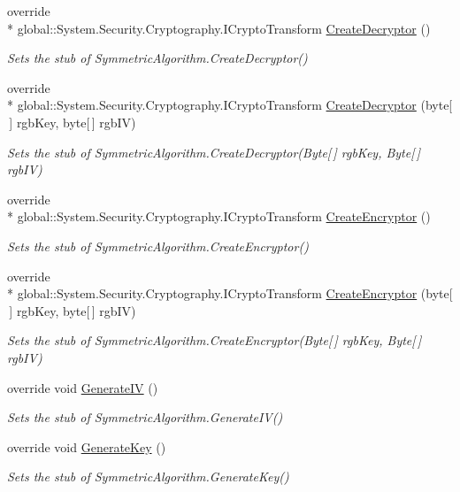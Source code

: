 \begin{DoxyCompactItemize}
override \\*
global\-::\-System.\-Security.\-Cryptography.\-I\-Crypto\-Transform \hyperlink{class_system_1_1_security_1_1_cryptography_1_1_fakes_1_1_stub_r_c2_a925355423b607e5a2ec71102f4bd8a7d}{Create\-Decryptor} ()
\begin{DoxyCompactList}\small\item\em Sets the stub of Symmetric\-Algorithm.\-Create\-Decryptor()\end{DoxyCompactList}\item 
override \\*
global\-::\-System.\-Security.\-Cryptography.\-I\-Crypto\-Transform \hyperlink{class_system_1_1_security_1_1_cryptography_1_1_fakes_1_1_stub_r_c2_a5d999c0cfb96085b1d68d06242aafa4e}{Create\-Decryptor} (byte\mbox{[}$\,$\mbox{]} rgb\-Key, byte\mbox{[}$\,$\mbox{]} rgb\-I\-V)
\begin{DoxyCompactList}\small\item\em Sets the stub of Symmetric\-Algorithm.\-Create\-Decryptor(\-Byte\mbox{[}$\,$\mbox{]} rgb\-Key, Byte\mbox{[}$\,$\mbox{]} rgb\-I\-V)\end{DoxyCompactList}\item 
override \\*
global\-::\-System.\-Security.\-Cryptography.\-I\-Crypto\-Transform \hyperlink{class_system_1_1_security_1_1_cryptography_1_1_fakes_1_1_stub_r_c2_a2353d087bd1959c1938f7ca8cc9bb484}{Create\-Encryptor} ()
\begin{DoxyCompactList}\small\item\em Sets the stub of Symmetric\-Algorithm.\-Create\-Encryptor()\end{DoxyCompactList}\item 
override \\*
global\-::\-System.\-Security.\-Cryptography.\-I\-Crypto\-Transform \hyperlink{class_system_1_1_security_1_1_cryptography_1_1_fakes_1_1_stub_r_c2_a18cc2e2194157b29f6bb66223e6285d4}{Create\-Encryptor} (byte\mbox{[}$\,$\mbox{]} rgb\-Key, byte\mbox{[}$\,$\mbox{]} rgb\-I\-V)
\begin{DoxyCompactList}\small\item\em Sets the stub of Symmetric\-Algorithm.\-Create\-Encryptor(\-Byte\mbox{[}$\,$\mbox{]} rgb\-Key, Byte\mbox{[}$\,$\mbox{]} rgb\-I\-V)\end{DoxyCompactList}\item 
override void \hyperlink{class_system_1_1_security_1_1_cryptography_1_1_fakes_1_1_stub_r_c2_ad8d21268b680b95e49ebb1bd870212d1}{Generate\-I\-V} ()
\begin{DoxyCompactList}\small\item\em Sets the stub of Symmetric\-Algorithm.\-Generate\-I\-V()\end{DoxyCompactList}\item 
override void \hyperlink{class_system_1_1_security_1_1_cryptography_1_1_fakes_1_1_stub_r_c2_a33df25bcd366139d5e44bb74c256709a}{Generate\-Key} ()
\begin{DoxyCompactList}\small\item\em Sets the stub of Symmetric\-Algorithm.\-Generate\-Key()\end{DoxyCompactList}\end{DoxyCompactItemize}

